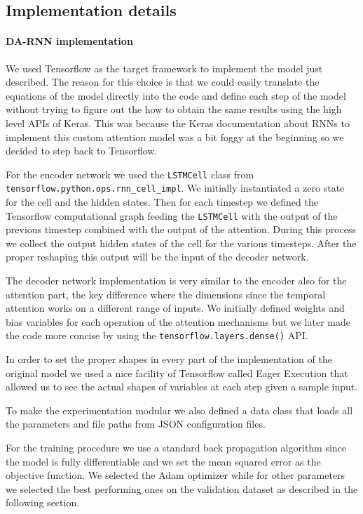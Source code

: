 \documentclass{article}
\begin{document}
\subsection{Implementation details}

\paragraph{DA-RNN implementation}

We used Tensorflow as the target framework to implement the model just
described. The reason for this choice is that we
could easily translate the equations of the model directly into the code and
define each step of the model without
trying to figure out the how to obtain the same results using the high level
APIs of Keras. This was because the
Keras documentation about RNNs to implement this custom attention model was a
bit foggy at the beginning so we decided
to step back to Tensorflow. 

For the encoder network we used the \texttt{LSTMCell} class from
\texttt{tensorflow.python.ops.rnn\_cell\_impl}.
We initially instantiated a zero state for the cell and the hidden states. Then
for each timestep we defined the
Tensorflow computational graph feeding the \texttt{LSTMCell} with the output of
the previous timestep combined with the
output of the attention. During this process we collect the output hidden
states of the cell for the various timesteps.
After the proper reshaping this output will be the input of the decoder network.

The decoder network implementation is very similar to the encoder also for the
attention part, the key difference where
the dimensions since the temporal attention works on a different range of
inputs. We initially defined weights and bias
variables for each operation of the attention mechanisms but we later made the
code more concise by using the
\texttt{tensorflow.layers.dense()} API.

In order to set the proper shapes in every part of the implementation of the
original model we used a nice facility of
Tensorflow called Eager Execution that allowed us to see the actual shapes of
variables at each step given a sample
input.

To make the experimentation modular we also defined a data class that loads all
the parameters and file paths from
JSON configuration files.

For the training procedure we use a standard back propagation algorithm since
the model is fully differentiable and we
set the mean squared error as the objective function. We selected the Adam
optimizer while for other parameters we
selected the best performing ones on the validation dataset as described in the
following section.
\end{document}
